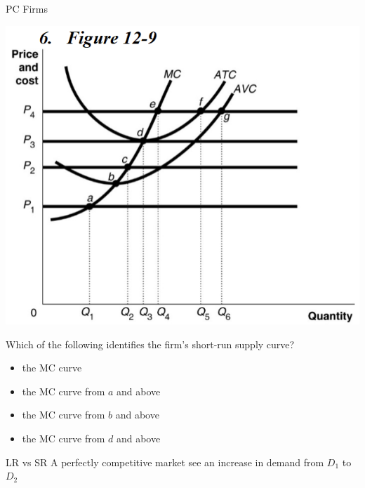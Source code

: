\documentclass{beamer}
\begin{document}
\begin{frame}[t]{PC Firms}
    \begin{center}
        \includegraphics[scale=.6]{images/graph.png}
    \end{center}
    \newline
    Which of the following identifies the firm's short-run supply curve?
    \begin{itemize}
        \item the MC curve
        \item the MC curve from $a$ and above
        \item the MC curve from $b$ and above
        \item the MC curve from $d$ and above
    \end{itemize}
\end{frame}

\begin{frame}{LR vs SR}
    A perfectly competitive market see an increase in demand from $D_1$ to $D_2$
    \begin{center}
\end{center}
\end{frame}
\end{document}
